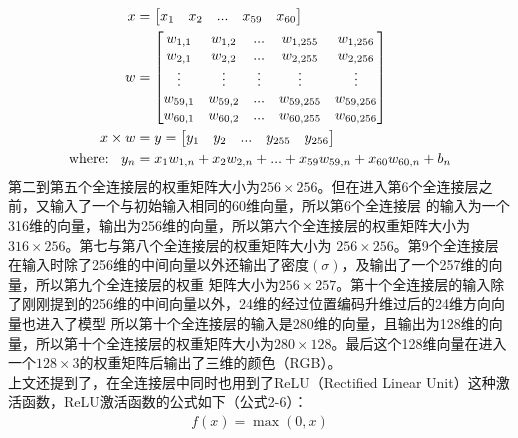 \documentclass{nwputhesis}
\begin{document}
\begin{equation}
    \begin{aligned}
        x &= \begin{bmatrix}
            x_1 & x_2 & ... & x_{59} & x_{60}
        \end{bmatrix}
        \\
        w &=
            \begin{bmatrix}
                    w_{1,1} & w_{1,2} & ... & w_{1,255} & w_{1,256}\\
                    w_{2,1} & w_{2,2} & ... & w_{2,255} & w_{2,256}\\
                    \vdots & \vdots & \vdots & \vdots & \vdots\\
                    w_{59,1} & w_{59,2} & ... & w_{59,255} & w_{59,256}\\
                    w_{60,1} & w_{60,2} & ... & w_{60,255} & w_{60,256}\\
            \end{bmatrix}
        \\
        x \times w &= y = \begin{bmatrix}
            y_1 & y_2 & ... & y_{255} & y_{256}
        \end{bmatrix}
        \\
        \text{where: \space} y_n &= x_1w_{1,n} + x_2w_{2,n} + ... + x_{59}w_{59,n} + x_{60}w_{60,n} + b_n 
    \end{aligned}
\end{equation}
\indent
第二到第五个全连接层的权重矩阵大小为$256 \times 256$。但在进入第6个全连接层之前，又输入了一个与初始输入相同的60维向量，所以第6个全连接层
的输入为一个316维的向量，输出为256维的向量，所以第六个全连接层的权重矩阵大小为$316 \times 256$。第七与第八个全连接层的权重矩阵大小为
$256 \times 256$。第9个全连接层在输入时除了256维的中间向量以外还输出了密度$(\sigma)$，及输出了一个257维的向量，所以第九个全连接层的权重
矩阵大小为$256 \times 257$。第十个全连接层的输入除了刚刚提到的256维的中间向量以外，24维的经过位置编码升维过后的24维方向向量也进入了模型
所以第十个全连接层的输入是280维的向量，且输出为128维的向量，所以第十个全连接层的权重矩阵大小为$280 \times 128$。最后这个128维向量在进入
一个$128 \times 3$的权重矩阵后输出了三维的颜色（RGB）。
\\
\indent
上文还提到了，在全连接层中同时也用到了ReLU（Rectified Linear Unit）这种激活函数，ReLU激活函数的公式如下（公式2-6）：
\begin{equation}
    \begin{aligned}
        f(x) = \max(0,x)
    \end{aligned}
\end{equation}
\end{document}
